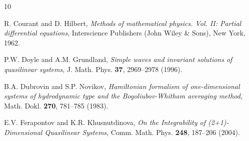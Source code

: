 \documentclass{birkjour}
\theoremstyle{definition}
\theoremstyle{remark}
\numberwithin{equation}{section}
\numberwithin{equation}{section}
\numberwithin{thm}{section}
\numberwithin{equation}{section}
\numberwithin{thm}{section}
\begin{document}
\begin{thebibliography}{10}
	
	
	
	
	
	R. Courant and D. Hilbert, {\sl Methods of mathematical physics. Vol. II: Partial differential equations}, Interscience Publishers (John Wiley \& Sons), New York, 1962. 
	
	P.W. Doyle and A.M. Grundland, {\it Simple waves and invariant solutions of quasilinear systems}, J. Math. Phys. {\bf 37}, 2969--2978  (1996).
	
	B.A. Dubrovin and S.P. Novikov, {\it Hamiltonian formalism of one-dimensional systems of hydrodynamic type and the Bogoliubov-Whitham averaging method}, Math. Dokl. {\bf 270}, 781--785 (1983).
	
	
	E.V. Ferapontov and K.R. Khusnutdinova, 
	{\it On the Integrability of (2+1)-Dimensional Quasilinear Systems},
	Comm. Math. Phys. {\bf 248}, 187--206 (2004).
	
	

\end{thebibliography}
\end{document}
